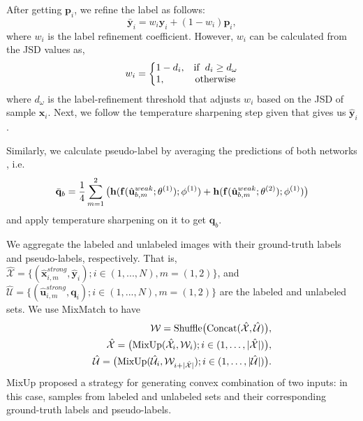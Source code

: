 \documentclass[10pt,twocolumn,letterpaper]{article}
\DeclareMathOperator{\shuffle}{Shuffle}
\DeclareMathOperator{\concat}{Concat}
\begin{document}
After getting $\mathbf{p}_i$, we refine the label as follows:
\begin{equation} \label{eq:label_refinement}
    \bar{\mathbf{y}}_i=w_i \mathbf{y}_i+(1-w_i)\mathbf{p}_{i}, 
\end{equation}
where $w_i$ is the label refinement coefficient. However, $w_i$ can be calculated from the JSD values as,
\begin{equation} \label{eq:weight}
  w_i  =\left\{
  \begin{array}{@{}ll@{}}
    1 - d_i, & \text{if} \hspace{0.2cm}  d_{i} \geq d_{\omega} \\
    1, & \hspace{0.05cm} \text{otherwise}
  \end{array}\right.
\end{equation}
where $d_{\omega}$ is the label-refinement threshold that adjusts $w_i$ based on the JSD of sample $\mathbf{x}_i$. Next, we follow the temperature sharpening \cite{li2020dividemix} step given that gives us $\hat{\mathbf{y}}_i$.


Similarly, we calculate pseudo-label by averaging the predictions of both networks \cite{li2020dividemix}, i.e.
\begin{equation} \label{eq:label_guessing}
\bar{\mathbf{q}}_{b}  =\frac{1}{4}\sum_{m=1}^{2}\big(\mathbf{h}(\mathbf{f}(\hat{\mathbf{u}}^{weak}_{b,m};\theta^{(1)}); \phi^{(1)})+\\ \mathbf{h}(\mathbf{f}(\hat{\mathbf{u}}^{weak}_{b,m};\theta^{(2)}); \phi^{(1)})\big)
\end{equation}
and apply temperature sharpening on it to get $\mathbf{q}_b$.

We aggregate the labeled and unlabeled images with their ground-truth labels and pseudo-labels, respectively.  That is, $\hat{\mathcal{X}}=\{(\hat{\mathbf{x}}^{strong}_{i,m},\hat{\mathbf{y}}_i);i\in(1,...,N), m=(1,2)\}$, and $\hat{\mathcal{U}}=\{(\hat{\mathbf{u}}^{strong}_{i,m},\mathbf{q}_{i});i\in(1,...,N), m = (1,2) \}$ are the labeled and unlabeled sets. We use MixMatch \cite{berthelot2019mixmatch} to have
\begin{align}
\vspace{-6mm}
    \mathcal{W} = \shuffle\mathopen{}\big(\mathopen{}\concat(\hat{\mathcal{X}}, \hat{\mathcal{U}})\big), \\
    \hat{\mathcal{X}} = \big(\mathopen{}\mathrm{MixUp}(\hat{\mathcal{X}}_i, \mathcal{W}_i); i \in (1, \ldots, |\hat{\mathcal{X}}|)\big), \\
    \hat{\mathcal{U}} = \big(\mathopen{}\mathrm{MixUp}(\hat{\mathcal{U}}_i, \mathcal{W}_{i+|\hat{\mathcal{X}}|}); i \in (1, \ldots, |\hat{\mathcal{U}}|)\big). 
\vspace{-6mm}
\end{align}
MixUp \cite{zhang2018mixup} proposed a strategy for generating convex combination of two inputs: in this case, samples from labeled and unlabeled sets and their corresponding ground-truth labels and pseudo-labels.
\end{document}
